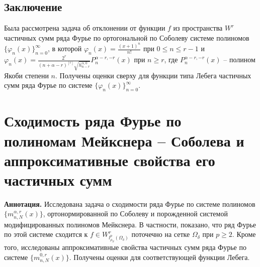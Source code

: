 \subsection{Заключение}
Была рассмотрена задача об отклонении от функции $f$ из пространства $W^r$ частичных сумм ряда Фурье по ортогональной по Соболеву системе полиномов $\{\varphi_n(x)\}_{n=0}^\infty$, в которой $\varphi_n(x)=\frac{(x+1)^n}{n!}$ при $0\le n\le r-1$ и $\varphi_n(x)=\frac{2^r}{(n+\alpha-r)^{[r]}\sqrt{h_{n-r}^{\alpha,0}}}P_n^{\alpha-r,-r}(x)$ при $n\ge r$, где $P_n^{\alpha-r,-r}(x)$ -- полином Якоби степени $n$. Получены оценки сверху для функции типа Лебега частичных сумм ряда Фурье по системе $\{\varphi_n(x)\}_{n=0}^\infty$.


\section{Сходимость ряда Фурье по полиномам Мейкснера -- Соболева и аппроксимативные свойства его частичных сумм}\label{Ram-Mex}

\textbf{ Аннотация.} Исследована задача о сходимости ряда Фурье по системе полиномов $\{m_{n,N}^{\alpha,r}(x)\}$, ортонормированной по Соболеву и порожденной системой модифицированных полиномов Мейкснера. В частности, показано, что ряд Фурье по этой системе сходится к $f\in W^r_{l^p_{\rho_N}(\Omega_\delta)}$ поточечно на сетке $\Omega_\delta$ при $p\ge2$. Кроме того, исследованы аппроксимативные свойства частичных сумм ряда Фурье по системе $\{m_{n,N}^{0,r}(x)\}$. Получены оценки для соответствующей функции Лебега.

